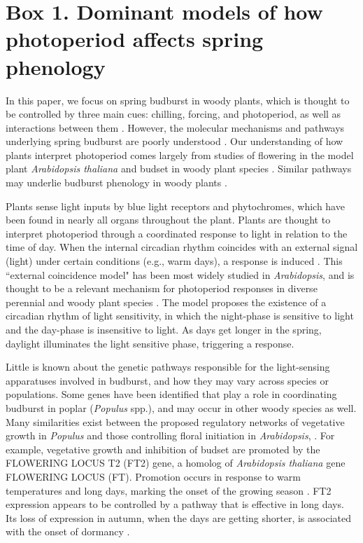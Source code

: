 \documentclass{article}
\begin{document}
\section*{Box 1. Dominant models of how photoperiod affects spring phenology}
\par In this paper, we focus on spring budburst in woody plants, which is thought to be controlled by three main cues: chilling, forcing, and photoperiod, as well as interactions between them \citep{flynn2018,Heide:2008aa, zohner2016}. However, the molecular mechanisms and pathways underlying spring budburst are poorly understood \citep{ding2016}. Our understanding of how plants interpret photoperiod comes largely from studies of flowering in the model plant \emph{Arabidopsis thaliana} \citep[e.g.,][]{suarez2001} and budset in woody plant species \citep[e.g., ][]{Howe:1996}. Similar pathways may underlie budburst phenology in woody plants \citep{lagercrantz2009,ding2016}.
\par Plants sense light inputs by blue light receptors and phytochromes, which have been found in nearly all organs throughout the plant. Plants are thought to interpret photoperiod through a coordinated response to light in relation to the time of day. When the internal circadian rhythm coincides with an external signal (light) under certain conditions (e.g., warm days), a response is induced \citep{lagercrantz2009}. This ``external coincidence model" has been most widely studied in \emph{Arabidopsis}, and is thought to be a relevant mechanism for photoperiod responses in diverse perennial and woody plant species \citep{davis2002,petterle2013,bastow2002,kobayashi2007,andres2012,Singh:2017}. %
The model proposes the existence of a circadian rhythm of light sensitivity, in which the night-phase is sensitive to light and the day-phase is insensitive to light. As days get longer in the spring, daylight illuminates the  light sensitive phase, triggering a response.
\par Little is known about the genetic pathways responsible for the light-sensing apparatuses involved in budburst, and how they may vary across species or populations. Some genes have been identified that play a role in coordinating budburst in poplar (\emph{Populus} spp.), and may occur in other woody species as well. Many similarities exist between the proposed regulatory networks of vegetative growth in \emph{Populus} and those controlling floral initiation in \emph{Arabidopsis}, \citet{ding2016}. For example, vegetative growth and inhibition of budset are promoted by the FLOWERING LOCUS T2 (FT2) gene, a homolog of \emph{Arabidopsis thaliana} gene FLOWERING LOCUS (FT). Promotion occurs in response to warm temperatures and long days, marking the onset of the growing season \citep{hsu2011}. FT2 expression appears to be controlled by a pathway that is effective in long days. Its loss of expression in autumn, when the days are getting shorter, is associated with the onset of dormancy \citep{glover2014}.
\end{document}

